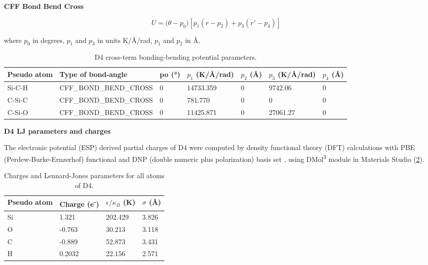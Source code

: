 \pagebreak

\textbf{CFF Bond Bend Cross}

\begin{equation}
    U = {(\theta - p}_{0}) [p_{1}(r - p_{2}) + p_{3}(r\prime - p_{4})]
\end{equation}

where \(p_0\) in degrees, \(p_1\) and \(p_3\) in units K/Å/rad, \(p_1\) and \(p_2\) in Å.

\begin{table}[H]
    \centering
    \caption{%
        D4 cross-term bonding-bending potential parameters.
    }\label{tbl:ff-d4-cross-bondbend}
    \begin{tabular}{@{}lllllll@{}}
        Pseudo atom & Type of bond-angle & po (°) & \(p_1\) (K/Å/rad) & \(p_2\) (Å) & \(p_3\) (K/Å/rad) & \(p_4\) (Å) \\
        \midrule
        Si-C-H & CFF\_BOND\_BEND\_CROSS & 0 & 14733.359 & 0 & 9742.06 & 0\\
        C-Si-C & CFF\_BOND\_BEND\_CROSS & 0 & 781.770 & 0 & 0 & 0\\
        C-Si-O & CFF\_BOND\_BEND\_CROSS & 0 & 11425.871 & 0 & 27061.27 & 0\\
        \bottomrule
    \end{tabular}
\end{table}

\textbf{D4 LJ parameters and charges}

The electronic potential (ESP) derived partial charges of D4 were computed by
density functional theory (DFT) calculations with PBE (Perdew-Burke-Ernzerhof)
functional \citep{perdewGeneralizedGradientApproximation1996} and DNP (double
numeric plus polarization) basis set
\citep{hehreSelfconsistentMolecularOrbital1972}, using DMol\textsuperscript{3}
module \citep{delleyAllElectronNumerical1990} in Materials Studio
\citep{accelrysMaterialsStudio2001} (\cref{tbl:ff-d4-charge}).

\begin{table}[H]
    \centering
    \caption{%
        Charges and Lennard-Jones parameters for all atoms of D4.
    }\label{tbl:ff-d4-charge}
    \begin{tabular}{@{}llll@{}}
        Pseudo atom & Charge (e\textsuperscript{-}) & \(\epsilon / \kappa_B\) (K) & \(\sigma\) (Å) \\
        \midrule
        Si & 1.321 & 202.429 & 3.826\\
        O & -0.763 & 30.213 & 3.118\\
        C & -0.889 & 52.873 & 3.431\\
        H & 0.2032 & 22.156 & 2.571\\
        \bottomrule
    \end{tabular}
\end{table}


